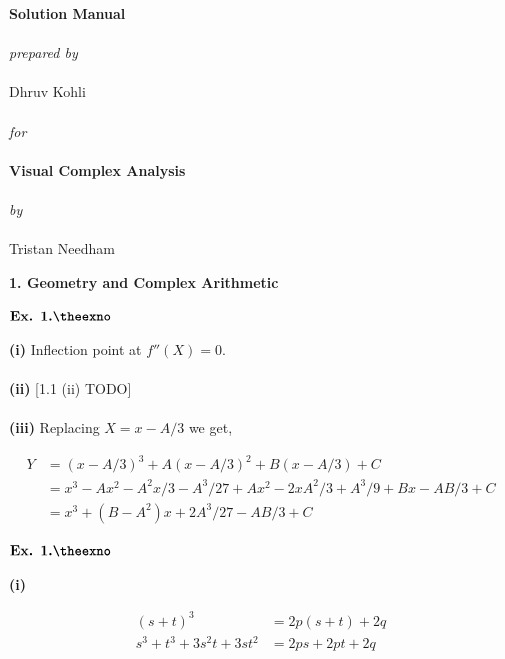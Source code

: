 \documentclass{article}
\def\tf{\textbf}
\newcounter{exno}
\begin{document}
\raggedright

\begin{center}
    \textbf{\Large{Solution Manual}}\\~\\
    \textit{prepared by}\\~\\
    Dhruv Kohli\\~\\
    \textit{for}\\~\\
    \textbf{\Large{Visual Complex Analysis}}\\~\\
    \textit{by}\\~\\
    \large{Tristan Needham}~\\
\end{center}
\clearpage

\begin{center}
    \textbf{\large{1. Geometry and Complex Arithmetic}}
\end{center}

${\textbf{Ex. 1.\theexno}}$
\addtocounter{exno}{1}

\tf{(i)} Inflection point at $f''(X)=0$.\\~\\

\tf{(ii)} [1.1 (ii) TODO]\\~\\

\tf{(iii)} Replacing $X=x-A/3$ we get,

\begin{align*}
    Y &= (x-A/3)^3 + A(x-A/3)^2 + B(x-A/3) + C\\
    &= x^3 - Ax^2 -A^2x/3 -A^3/27 + Ax^2 - 2xA^2/3 +A^3/9 + Bx - AB/3 + C\\
    &= x^3 +(B-A^2)x +2A^3/27-AB/3+C
\end{align*}

\vspace{0.2in}

${\textbf{Ex. 1.\theexno}}$
\addtocounter{exno}{1}

\tf{(i)} 

\begin{align*}
    (s+t)^3 &= 2p(s+t) + 2q\\
    s^3 + t^3 + 3s^2t + 3st^2 &= 2ps + 2pt + 2q\\
\end{align*}
\end{document}
